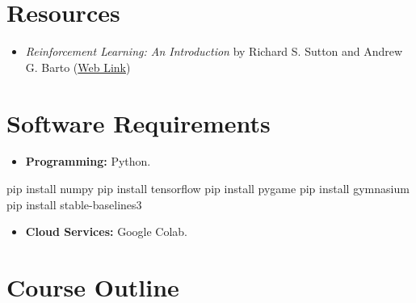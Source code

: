 \documentclass[
  letterpaper,
  DIV=11,
  numbers=noendperiod]{scrreprt}
\newenvironment{Shaded}{\begin{snugshade}}{\end{snugshade}}
\newcommand{\ExtensionTok}[1]{\textcolor[rgb]{0.00,0.23,0.31}{#1}}
\newcommand{\NormalTok}[1]{\textcolor[rgb]{0.00,0.23,0.31}{#1}}
\providecommand{\tightlist}{%
  \setlength{\itemsep}{0pt}\setlength{\parskip}{0pt}}\usepackage{longtable,booktabs,array}
\begin{document}
\section{Resources}\label{resources}

\begin{itemize}
\tightlist
\item
  \emph{Reinforcement Learning: An Introduction} by Richard S. Sutton
  and Andrew G. Barto
  (\href{https://www.andrew.cmu.edu/course/10-703/textbook/BartoSutton.pdf}{Web
  Link})
\end{itemize}

\section{Software Requirements}\label{software-requirements}

\begin{itemize}
\tightlist
\item
  \textbf{Programming:} Python.
\end{itemize}

\begin{Shaded}
\begin{Highlighting}[]
\ExtensionTok{pip}\NormalTok{ install numpy}
\ExtensionTok{pip}\NormalTok{ install tensorflow}
\ExtensionTok{pip}\NormalTok{ install pygame}
\ExtensionTok{pip}\NormalTok{ install gymnasium}
\ExtensionTok{pip}\NormalTok{ install stable{-}baselines3}
\end{Highlighting}
\end{Shaded}

\begin{itemize}
\tightlist
\item
  \textbf{Cloud Services:} Google Colab.
\end{itemize}

\section{Course Outline}\label{course-outline}
\end{document}
